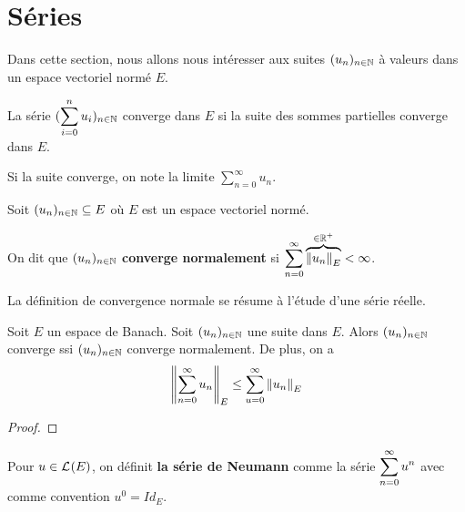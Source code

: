 \section{Séries}

Dans cette section, nous allons nous intéresser aux suites
$(u_{n})_{n \in \mathbb{N}}$ à valeurs dans un espace vectoriel normé $E$.

\begin{definition}
\label{definition:serie_convergence}
	La série $\displaystyle (\sum_{i = 0}^{n}u_{i})_{n \in \mathbb{N}}$ converge dans $E$ si
	la suite des sommes partielles converge dans $E$.

	Si la suite converge, on note la limite $\displaystyle \sum_{n = 0}^{\infty}
	u_{n}$.
\end{definition}

\begin{definition}
\label{definition:serie_normal_convergence}
	Soit $(u_{n})_{n \in \mathbb{N}} \subseteq E$ où $E$ est un espace
	vectoriel normé.

	On dit que $(u_{n})_{n \in \mathbb{N}}$ \textbf{converge normalement} si
	$\displaystyle \sum_{n = 0}^{\infty} \overbrace{\norm{u_{n}}_{E}}^{\in \mathbb{R}^{+}} < \infty$.
\end{definition}

La définition de convergence normale se résume à l'étude d'une série réelle.

\begin{proposition}
\label{proposition:normal_imply_convergence}
	Soit $E$ un espace de Banach.
	Soit $(u_{n})_{n \in \mathbb{N}}$ une suite dans $E$.
	Alors $(u_{n})_{n \in \mathbb{N}}$ converge ssi
	$(u_{n})_{n \in \mathbb{N}}$ converge normalement. De plus, on a
	\begin{equation*}
		\norm{\displaystyle \sum_{n = 0}^{\infty} u_{n}}_{E} \leq
		\displaystyle \sum_{u = 0}^{\infty} \norm{u_{n}}_{E}
	\end{equation*}
\end{proposition}

\ifdefined\outputproof
\begin{proof}

\end{proof}
\fi

\begin{definition}
\label{definition:neumann_serie}
	Pour $u \in \mathcal{L}_{}(E)$, on définit \textbf{la série de Neumann} comme la
	série $\displaystyle \sum_{n = 0}^{\infty} u^{n}$ avec comme convention $u^{0} = Id_{E}$.
\end{definition}


